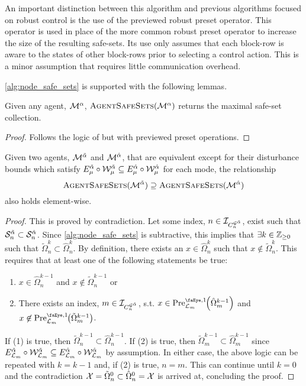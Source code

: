 \begin{remark}
An important distinction between this algorithm and previous algorithms focused on robust control is the use of the previewed robust preset operator. This operator is used in place of the more common robust preset operator to increase the size of the resulting safe-sets. Its use only assumes that each block-row is aware to the states of other block-rows prior to selecting a control action. This is a minor assumption that requires little communication overhead.
\end{remark}
\autoref{alg:node_safe_sets} is supported with the following lemmas. 
\begin{lemma}\label{lemma:maximal_proof}
Given any agent, $\mathcal{M}^{\alpha}$, $\Call{AgentSafeSets}{\agent{\agentidx}}$ returns the maximal safe-set collection.
\end{lemma}
\begin{proof}
Follows the logic of \cite[Theorem 2]{Danielson2019} but with previewed preset operations.
\end{proof}
\begin{lemma}
Given two agents, $\mathcal{M}^{\tilde{\alpha}}$ and $\mathcal{M}^{\hat{\alpha}}$, that are equivalent except for their disturbance bounds which satisfy $E_{{\mu}}^{\tilde{\alpha}}\circ\mathcal{W}^{\tilde{\alpha}}_{\mu}\subseteq E_{{\mu}}^{\hat{\alpha}}\circ\mathcal{W}^{\hat{\alpha}}_{\mu}$ for each mode, the relationship
$$\Call{AgentSafeSets}{\agent{\tilde\agentidx}}\supseteq\Call{AgentSafeSets}{\agent{\hat\agentidx}}$$
also holds element-wise. 
\end{lemma}
\begin{proof}
This is proved by contradiction. Let some index, $n\in\idxset{\gnumnodes[\tilde\agentidx]}$, exist such that $\mathcal{S}_n^{\tilde{\alpha}}\subset\mathcal{S}_n^{\hat{\alpha}}$. Since \autoref{alg:node_safe_sets} is subtractive, this implies that $\exists k\in\mathbb{Z}_{\geq 0}$ such that $\tilde\Omega^k_{n}\subset\hat\Omega^k_{n}$. By definition, there exists an $x\in\hat\Omega^k_{n}$ such that $x\not\in\tilde\Omega^k_{n}$. This requires that at least one of the following statements be true:
\begin{enumerate}
\item $x\in\hat\Omega^{k-1}_{n}$ and $x\not\in\tilde\Omega^{k-1}_{n}$ or
\item There exists an index, $m\in\idxset{\gnumnodes[\tilde\agentidx]}$, s.t. $x\in\PreviewedPre[\gnodelabel{m}][1]{\hat\Omega^{k-1}_{m}}$ and $x\not\in\PreviewedPre[\gnodelabel{m}][1]{\tilde\Omega^{k-1}_{m}}$.
\end{enumerate}
If (1) is true, then $\tilde\Omega^{k-1}_{n}\subset\hat\Omega^{k-1}_{n}$. If (2) is true, then $\tilde\Omega^{k-1}_{m}\subset\hat\Omega^{k-1}_{m}$ since $E_{\mathcal{L}_{m}}^{\tilde{\alpha}}\circ\mathcal{W}^{\tilde{\alpha}}_{\mathcal{L}_{m}}\subseteq E_{\mathcal{L}_{m}}^{\hat{\alpha}}\circ\mathcal{W}^{\hat{\alpha}}_{\mathcal{L}_{m}}$ by assumption. In either case, the above logic can be repeated with $k=k-1$ and, if (2) is true, $n=m$. This can continue until $k=0$ and the contradiction $\xcon = \tilde\Omega^0_{n}\subset\hat{\Omega}^0_{n}=\xcon$ is arrived at, concluding the proof. 
\end{proof}


